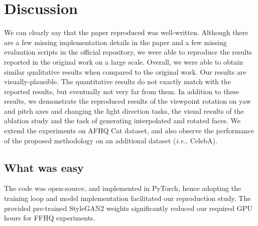 \section{Discussion}

We can clearly say that the paper reproduced was well-written. Although there are a few missing implementation details in the paper and a few missing evaluation scripts in the official repository, we were able to reproduce the results reported in the original work on a large scale. 
Overall, we were able to obtain similar qualitative results when compared to the original work. Our results are visually-plausible. The quantitative results do not exactly match with the reported results, but eventually not very far from them. In addition to these results, we demonstrate the reproduced results of the viewpoint rotation on yaw and pitch axes and changing the light direction tasks, the visual results of the ablation study and the task of generating interpolated and rotated faces. We extend the experiments on AFHQ Cat dataset, and also observe the performance of the proposed methodology on an additional dataset (\textit{i.e.,} CelebA).


\subsection{What was easy}
The code was open-source, and implemented in PyTorch, hence adopting the training loop and model implementation facilitated our reproduction study. The provided pre-trained StyleGAN2 weights significantly reduced our required GPU hours for FFHQ experiments.

